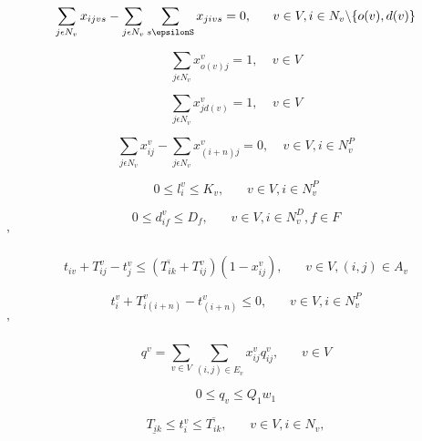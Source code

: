 \documentclass[a4paper,12pt]{article}
\begin{document}
\begin{equation} \label{eq:3}
    \sum_{j\epsilon N_v}x_{ijvs} - \sum_{j\epsilon N_v}\sum_{s\epsilonS} x_{jivs} = 0, ~~~~~ v \in V, i\in N_v \backslash \{o(v), d(v)\} 
\end{equation}

\begin{equation} \label{eq:4}
\sum_{j\epsilon N_v} x_{o(v)j}^v = 1, ~~~~~ v \in V
\end{equation}

\begin{equation} \label{eq:5}
\sum_{j\epsilon N_v} x_{j d(v)}^v = 1, ~~~~~ v \in V
\end{equation}

\begin{equation} \label{eq:6}
\sum_{j\epsilon N_v}x_{ij}^v - \sum_{j\epsilon N_v} x_{(i+n)j}^v = 0, ~~~~~ v \in V, i\in N^P_v
\end{equation}

\begin{equation} \label{eq:7}
0 \leq l_{i}^v \leq K_v, ~~~~~~~~ v \in V, i \in N^P_v
\end{equation}

\begin{equation} \label{eq:8}
0 \leq d_{if}^v \leq D_f, ~~~~~~~~ v \in V, i \in N^D_v, f \in F
\end{equation}'

\begin{equation} \label{eq:9}
t_{iv} + T_{ij}^v - t_{j}^v \leq (\overline{T_{ik}} + T_{ij}^v)(1 - x_{ij}^v), ~~~~~~~~ v \in V, (i,j) \in A_v
\end{equation}

\begin{equation} \label{eq:10}
    t_{i}^v + T_{i(i+n)}^v - t_{(i+n)}^v \leq 0, ~~~~~~~~ v \in V, i \in N^P_v
\end{equation}'

\begin{equation} \label{eq:11}
    q^v = \sum_{v \in V} \sum_{(i,j) \in E_v} x_{ij}^vq_{ij}^v,~~~~~~~~ v \in V
\end{equation}

\begin{equation} \label{eq:12}
    0 \leq q_v \leq Q_1w_1
\end{equation}

\begin{equation} \label{eq:13}
  \underline{T_{ik}} \leq t_{i}^v \leq  \overline{T_{ik}}, ~~~~~~~~ v \in V, i \in N_v,
\end{equation}
\end{document}
